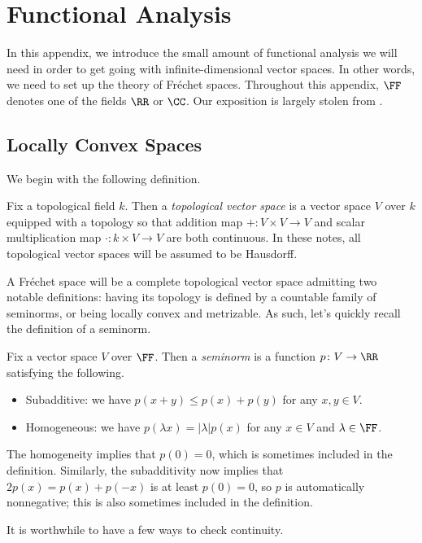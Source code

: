 \documentclass[notes.tex]{subfiles}
\begin{document}
\chapter{Functional Analysis} \label{chap:functional}
In this appendix, we introduce the small amount of functional analysis we will need in order to get going with infinite-dimensional vector spaces. In other words, we need to set up the theory of Fr\'echet spaces. Throughout this appendix, $\FF$ denotes one of the fields $\RR$ or $\CC$. Our exposition is largely stolen from \cite{conway-functional}.

\section{Locally Convex Spaces}
We begin with the following definition.
\begin{definition}
	Fix a topological field $k$. Then a \textit{topological vector space} is a vector space $V$ over $k$ equipped with a topology so that addition map $+\colon V\times V\to V$ and scalar multiplication map $\cdot\colon k\times V\to V$ are both continuous. In these notes, all topological vector spaces will be assumed to be Hausdorff.
\end{definition}
A Fr\'echet space will be a complete topological vector space admitting two notable definitions: having its topology is defined by a countable family of seminorms, or being locally convex and metrizable. As such, let's quickly recall the definition of a seminorm.
\begin{definition}[seminorm]
	Fix a vector space $V$ over $\FF$. Then a \textit{seminorm} is a function $p\colon V\to\RR$ satisfying the following.
	\begin{itemize}
		\item Subadditive: we have $p(x+y)\le p(x)+p(y)$ for any $x,y\in V$.
		\item Homogeneous: we have $p(\lambda x)=\left|\lambda\right|p(x)$ for any $x\in V$ and $\lambda\in\FF$.
	\end{itemize}
\end{definition}
\begin{remark}
	The homogeneity implies that $p(0)=0$, which is sometimes included in the definition. Similarly, the subadditivity now implies that $2p(x)=p(x)+p(-x)$ is at least $p(0)=0$, so $p$ is automatically nonnegative; this is also sometimes included in the definition.
\end{remark}
It is worthwhile to have a few ways to check continuity.
\end{document}
